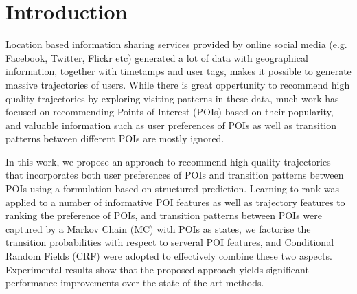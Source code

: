 \section{Introduction}
\label{sec:introduction}
Location based information sharing services provided by online social media 
(e.g. Facebook, Twitter, Flickr etc) generated a lot of data with geographical information, 
together with timetamps and user tags, makes it possible to generate massive trajectories of users.
While there is great oppertunity to recommend high quality trajectories by exploring visiting patterns
in these data, much work has focused on recommending Points of Interest (POIs) based on their
popularity\cite{}, and valuable information such as user preferences of POIs as well as transition
patterns between different POIs are mostly ignored.

In this work, we propose an approach to recommend high quality trajectories that incorporates both user 
preferences of POIs and transition patterns between POIs using a formulation based on structured prediction.
Learning to rank was applied to a number of informative POI features as well as trajectory features to ranking
the preference of POIs, and transition patterns between POIs were captured by a Markov Chain (MC) with POIs as states,
we factorise the transition probabilities with respect to serveral POI features, and Conditional Random Fields (CRF) 
were adopted to effectively combine these two aspects. 
Experimental results show that the proposed approach yields significant performance improvements over the state-of-the-art methods.
















